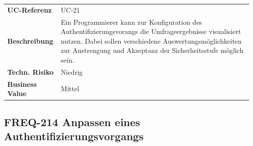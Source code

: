 \begin{longtable}[c]{@{}ll@{}}
\toprule
\begin{minipage}[t]{0.20\columnwidth}\raggedright\strut
\textbf{UC-Referenz}
\strut\end{minipage} &
\begin{minipage}[t]{0.74\columnwidth}\raggedright\strut
UC-21
\strut\end{minipage}\tabularnewline
\begin{minipage}[t]{0.20\columnwidth}\raggedright\strut
\textbf{Beschreibung}
\strut\end{minipage} &
\begin{minipage}[t]{0.74\columnwidth}\raggedright\strut
Ein Programmierer kann zur Konfiguration des Authentifizierungsvorangs
die Umfrageergebnisse visualisiert nutzen. Dabei sollen verschiedene
Auswertungsmöglichkeiten zur Anstrengung und Akzeptanz der
Sicherheitsstufe möglich sein.
\strut\end{minipage}\tabularnewline
\begin{minipage}[t]{0.20\columnwidth}\raggedright\strut
\textbf{Techn. Risiko}
\strut\end{minipage} &
\begin{minipage}[t]{0.74\columnwidth}\raggedright\strut
Niedrig
\strut\end{minipage}\tabularnewline
\begin{minipage}[t]{0.20\columnwidth}\raggedright\strut
\textbf{Business Value}
\strut\end{minipage} &
\begin{minipage}[t]{0.74\columnwidth}\raggedright\strut
Mittel
\strut\end{minipage}\tabularnewline
\bottomrule
\end{longtable}

\subsection{FREQ-214 Anpassen eines
Authentifizierungsvorgangs}\label{freq-214-anpassen-eines-authentifizierungsvorgangs}

